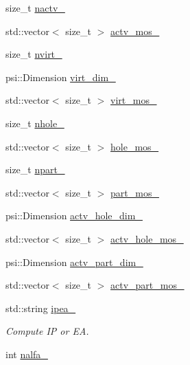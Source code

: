 \begin{DoxyCompactItemize}
size\+\_\+t \mbox{\hyperlink{classforte_1_1_f_c_i___m_o_a1ef99aae823efedc2308a6084e6ed99b}{nactv\+\_\+}}
\item 
std\+::vector$<$ size\+\_\+t $>$ \mbox{\hyperlink{classforte_1_1_f_c_i___m_o_a1e935d0e2587d7c81a276e1f0909ce97}{actv\+\_\+mos\+\_\+}}
\item 
size\+\_\+t \mbox{\hyperlink{classforte_1_1_f_c_i___m_o_a272668864820b7738f6fd0799e946b1c}{nvirt\+\_\+}}
\item 
psi\+::\+Dimension \mbox{\hyperlink{classforte_1_1_f_c_i___m_o_a5646158bc2f9c310885aa276dfdf3521}{virt\+\_\+dim\+\_\+}}
\item 
std\+::vector$<$ size\+\_\+t $>$ \mbox{\hyperlink{classforte_1_1_f_c_i___m_o_ad8cb54742519982bb0c828144d08c339}{virt\+\_\+mos\+\_\+}}
\item 
size\+\_\+t \mbox{\hyperlink{classforte_1_1_f_c_i___m_o_ad2c788d549209771259de8af9232936d}{nhole\+\_\+}}
\item 
std\+::vector$<$ size\+\_\+t $>$ \mbox{\hyperlink{classforte_1_1_f_c_i___m_o_a3ad72c929c5d5e87298cc78f04c7e3e4}{hole\+\_\+mos\+\_\+}}
\item 
size\+\_\+t \mbox{\hyperlink{classforte_1_1_f_c_i___m_o_a26e30238b6221986cd5fed921c7eab02}{npart\+\_\+}}
\item 
std\+::vector$<$ size\+\_\+t $>$ \mbox{\hyperlink{classforte_1_1_f_c_i___m_o_a440db119855a170bc078ef0f70649cd2}{part\+\_\+mos\+\_\+}}
\item 
psi\+::\+Dimension \mbox{\hyperlink{classforte_1_1_f_c_i___m_o_a043fb553093615233e8b69f8ec2c15b3}{actv\+\_\+hole\+\_\+dim\+\_\+}}
\item 
std\+::vector$<$ size\+\_\+t $>$ \mbox{\hyperlink{classforte_1_1_f_c_i___m_o_a663fc2003999a539942bd8f83e14b71a}{actv\+\_\+hole\+\_\+mos\+\_\+}}
\item 
psi\+::\+Dimension \mbox{\hyperlink{classforte_1_1_f_c_i___m_o_ae6b4a26b2ea77e909f5da24693e9f855}{actv\+\_\+part\+\_\+dim\+\_\+}}
\item 
std\+::vector$<$ size\+\_\+t $>$ \mbox{\hyperlink{classforte_1_1_f_c_i___m_o_aece1107076daa41e4ee80a314c21e5c3}{actv\+\_\+part\+\_\+mos\+\_\+}}
\item 
std\+::string \mbox{\hyperlink{classforte_1_1_f_c_i___m_o_aa3603c25cac5efeae601c5d6476cfbe6}{ipea\+\_\+}}
\begin{DoxyCompactList}\small\item\em Compute IP or EA. \end{DoxyCompactList}\item 
int \mbox{\hyperlink{classforte_1_1_f_c_i___m_o_abe453ff71db12bba46248f9882927078}{nalfa\+\_\+}}

\end{DoxyCompactItemize}
